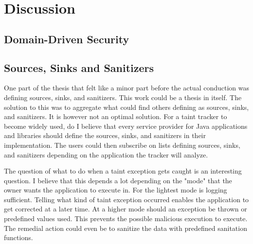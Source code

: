 \chapter{Discussion}

\section{Domain-Driven Security}

\section{Sources, Sinks and Sanitizers}
One part of the thesis that felt like a minor part before the actual conduction was defining sources, sinks, and sanitizers. This work could be a thesis in itself. The solution to this was to aggregate what could find others defining as sources, sinks, and sanitizers. It is however not an optimal solution. For a taint tracker to become widely used, do I believe that every service provider for Java applications and libraries should define the sources, sinks, and sanitizers in their implementation. The users could then subscribe on lists defining sources, sinks, and sanitizers depending on the application the tracker will analyze.

The question of what to do when a taint exception gets caught is an interesting question. I believe that this depends a lot depending on the "mode" that the owner wants the application to execute in. For the lightest mode is logging sufficient. Telling what kind of taint exception occurred enables the application to get corrected at a later time. At a higher mode should an exception be thrown or predefined values used. This prevents the possible malicious execution to execute. The remedial action could even be to sanitize the data with predefined sanitation functions. 



